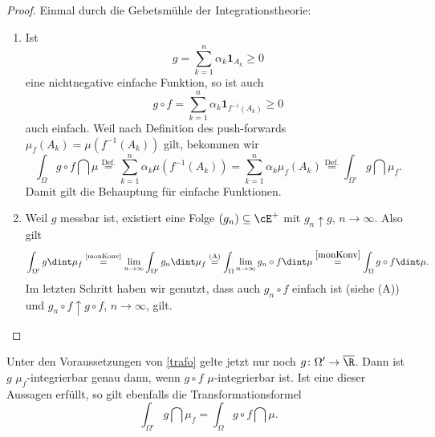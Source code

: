 \begin{proof} Einmal durch die Gebetsm\"uhle der Integrationstheorie:
	\begin{enumerate}[label=(\Alph*)]
		\item Ist \[ g = \sum\limits_{k = 1}^{n} \alpha_k \mathbf{1}_{A_k} \geq 0 \] eine nichtnegative einfache Funktion, so ist auch \[ g \circ f = \sum\limits_{k = 1}^{n} \alpha_k \mathbf{1}_{f^{-1}(A_k)} \geq 0 \] auch einfach. Weil nach Definition des push-forwards $ \mu_f(A_k) = \mu(f^{-1}(A_k)) $ gilt, bekommen wir \[ \int_{\Omega} g \circ f \dint \mu \overset{\text{Def.}}{=} \sum\limits_{k = 1}^{n} \alpha_k \mu(f^{-1}(A_k))=\sum\limits_{k = 1}^{n} \alpha_k \mu_f(A_k) \overset{\text{Def.}}{=} \int_{\Omega'} g \dint \mu_f. \]
		Damit gilt die Behauptung für einfache Funktionen.
		\item Weil $g$ messbar ist, existiert eine Folge $(g_n) \subseteq \cE^+$ mit $g_n \uparrow g$, $n \to \infty$. Also gilt \[ \int_{\Omega'} g \dint \mu_f \overset{\text{\ref{monKonv}}}{=} \lim\limits_{n \to \infty} \int_{\Omega'} g_n \dint \mu_f \overset{\text{(A)}}{=} \int_{\Omega} \lim_{n\to\infty} g_n\circ f \dint \mu \overset{\ref{monKonv}}{=} \int_{\Omega} g \circ f \dint \mu. \]
		Im letzten Schritt haben wir genutzt, dass auch $g_n \circ f$ einfach ist (siehe (A)) und $g_n \circ f \uparrow g \circ f$, $n\to\infty$, gilt.
	\end{enumerate}
\end{proof}
\begin{korollar}\label{korTrafo}
	Unter den Voraussetzungen von \ref{trafo} gelte jetzt nur noch $g \colon \Omega' \rightarrow \overline{\R}$. Dann ist $g$ $\mu_f$-integrierbar genau dann, wenn $ g \circ f$ $\mu$-integrierbar ist. Ist eine dieser Aussagen erfüllt, so gilt ebenfalls die Transformationsformel
	\[ \int_{\Omega'} g \dint \mu_f = \int_{\Omega} g \circ f \dint \mu. \]
\end{korollar}
